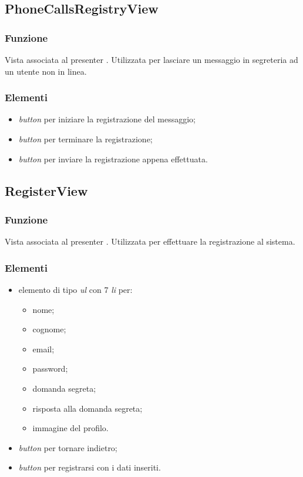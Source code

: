 \subsection{PhoneCallsRegistryView}
\subsubsection*{Funzione}
Vista associata al presenter . Utilizzata per lasciare un messaggio in segreteria ad un utente non in linea.
\subsubsection*{Elementi}
\begin{itemize}
\item \textit{button} per iniziare la registrazione del messaggio;
\item \textit{button} per terminare la registrazione;
\item \textit{button} per inviare la registrazione appena effettuata.
\end{itemize}

\subsection{RegisterView}
\subsubsection*{Funzione}
Vista associata al presenter . Utilizzata per effettuare la registrazione al sistema.
\subsubsection*{Elementi}
\begin{itemize}
\item elemento di tipo \textit{ul} con 7 \textit{li} per:
\begin{itemize}
\item nome;
\item cognome;
\item email;
\item password;
\item domanda segreta;
\item risposta alla domanda segreta;
\item immagine del profilo.
\end{itemize}
\item \textit{button} per tornare indietro;
\item \textit{button} per registrarsi con i dati inseriti.
\end{itemize}

